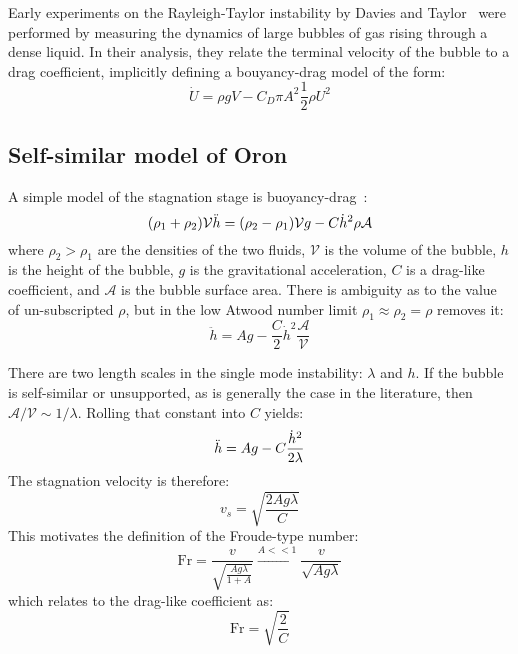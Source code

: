 Early experiments on the Rayleigh-Taylor instability by Davies and Taylor~\cite{Davies1950a} were performed by measuring the dynamics of large bubbles of gas rising through a dense liquid.
In their analysis, they relate the terminal velocity of the bubble to a drag coefficient, implicitly defining a bouyancy-drag model of the form:
\begin{equation}
\dot{U} = \rho g V - C_D \pi A^2 \frac{1}{2} \rho U^2
\end{equation}

\subsection{Self-similar model of Oron}

A simple model of the stagnation stage is buoyancy-drag~\cite{Oron2001}:
\begin{equation} \elabel{buoyancy_drag}
(\rho_1 + \rho_2) \mathcal{V} \ddot{h} = (\rho_2 - \rho_1) \mathcal{V} g - C \dot{h}^2 \rho \mathcal{A}
\end{equation}
where $\rho_2 > \rho_1$ are the densities of the two fluids, 
$\mathcal{V}$ is the volume of the bubble, 
$h$ is the height of the bubble,
$g$ is the gravitational acceleration,
$C$ is a drag-like coefficient, and
$\mathcal{A}$ is the bubble surface area.
There is ambiguity as to the value of un-subscripted $\rho$, but in the low Atwood number limit $\rho_1 \approx \rho_2 = \rho$ removes it:
\begin{equation}
\ddot{h} = A g - \frac{C}{2} \dot{h}^2 \frac{\mathcal{A}}{\mathcal{V}}
\end{equation}

There are two length scales in the single mode instability: $\lambda$ and $h$.
If the bubble is self-similar or unsupported, as is generally the case in the literature, then $\mathcal{A}/\mathcal{V} \sim 1/\lambda$.
Rolling that constant into $C$ yields:
\begin{equation} \elabel{bouancy_drag}
\ddot{h} = A g - C \frac{\dot{h}^2}{2 \lambda}  
\end{equation}
The stagnation velocity is therefore:
\begin{equation}
v_s = \sqrt{\frac{2 A g \lambda}{C}}
\end{equation}
This motivates the definition of the Froude-type number:
\begin{equation}
\text{Fr} = \frac{v}{\sqrt{\frac{A g \lambda}{1+A}}} \xrightarrow{A << 1} \frac{v}{\sqrt{A g \lambda}}
\end{equation}
which relates to the drag-like coefficient as:
\begin{equation}
\text{Fr} = \sqrt{\frac{2}{C}}
\end{equation}

